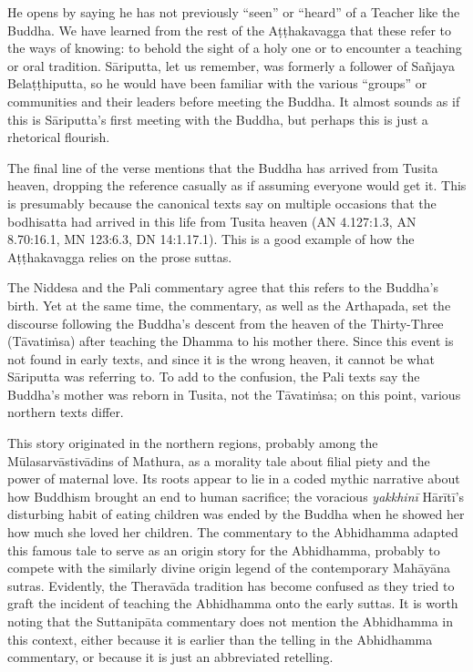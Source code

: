 \documentclass[12pt,openany]{book}%
\begin{document}
He opens by saying he has not previously “seen” or “heard” of a Teacher like the Buddha. We have learned from the rest of the \textsanskrit{Aṭṭhakavagga} that these refer to the ways of knowing: to behold the sight of a holy one or to encounter a teaching or oral tradition. \textsanskrit{Sāriputta}, let us remember, was formerly a follower of \textsanskrit{Sañjaya} \textsanskrit{Belaṭṭhiputta}, so he would have been familiar with the various “groups” or communities and their leaders before meeting the Buddha. It almost sounds as if this is \textsanskrit{Sāriputta}’s first meeting with the Buddha, but perhaps this is just a rhetorical flourish.

The final line of the verse mentions that the Buddha has arrived from Tusita heaven, dropping the reference casually as if assuming everyone would get it. This is presumably because the canonical texts say on multiple occasions that the bodhisatta had arrived in this life from Tusita heaven (AN 4.127:1.3, AN 8.70:16.1, MN 123:6.3, DN 14:1.17.1). This is a good example of how the \textsanskrit{Aṭṭhakavagga} relies on the prose suttas.

The Niddesa and the Pali commentary agree that this refers to the Buddha’s birth. Yet at the same time, the commentary, as well as the Arthapada, set the discourse following the Buddha’s descent from the heaven of the Thirty-Three (\textsanskrit{Tāvatiṁsa}) after teaching the Dhamma to his mother there. Since this event is not found in early texts, and since it is the wrong heaven, it cannot be what \textsanskrit{Sāriputta} was referring to. To add to the confusion, the Pali texts say the Buddha’s mother was reborn in Tusita, not the \textsanskrit{Tāvatiṁsa}; on this point, various northern texts differ.

This story originated in the northern regions, probably among the \textsanskrit{Mūlasarvāstivādins} of Mathura, as a morality tale about filial piety and the power of maternal love. Its roots appear to lie in a coded mythic narrative about how Buddhism brought an end to human sacrifice; the voracious \textit{\textsanskrit{yakkhinī}} \textsanskrit{Hārītī}’s disturbing habit of eating children was ended by the Buddha when he showed her how much she loved her children. The commentary to the Abhidhamma adapted this famous tale to serve as an origin story for the Abhidhamma, probably to compete with the similarly divine origin legend of the contemporary \textsanskrit{Mahāyāna} sutras. Evidently, the \textsanskrit{Theravāda} tradition has become confused as they tried to graft the incident of teaching the Abhidhamma onto the early suttas. It is worth noting that the \textsanskrit{Suttanipāta} commentary does not mention the Abhidhamma in this context, either because it is earlier than the telling in the Abhidhamma commentary, or because it is just an abbreviated retelling.
\end{document}
